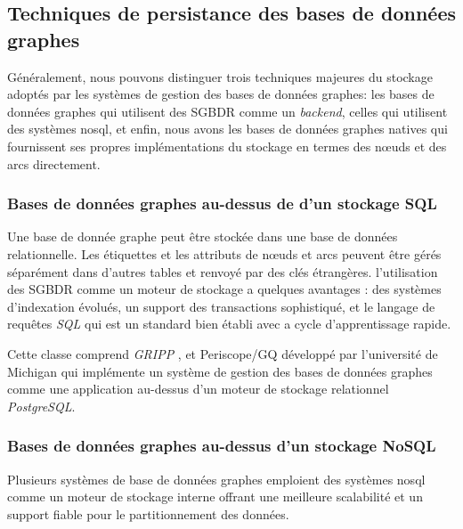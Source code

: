   \subsection{Techniques de persistance des bases de données graphes}
  \label{sec:persistence}
  Généralement, nous pouvons distinguer trois techniques majeures du
  stockage adoptés par les systèmes de gestion des bases de données
  graphes: les bases de données graphes qui utilisent des
  \acrshort{SGBDR} comme un \emph{backend}, celles qui utilisent des
  systèmes \acrshort{nosql}, et enfin, nous avons les bases de données
  graphes natives qui fournissent ses propres implémentations du
  stockage en termes des nœuds et des arcs directement.

    \subsubsection{Bases de données graphes au-dessus de d'un stockage  SQL}
    \label{sec:graphdb-over-sql}
    Une base de donnée graphe peut être stockée dans une base de
    données relationnelle. Les étiquettes et les attributs de nœuds et
    arcs peuvent être gérés séparément dans d'autres tables et renvoyé
    par des clés étrangères. l'utilisation des \acrshort{SGBDR} comme
    un moteur de stockage a quelques avantages : des systèmes
    d'indexation évolués, un support des transactions sophistiqué, et
    le langage de requêtes \emph{SQL} qui est un standard bien établi
    avec a cycle d'apprentissage rapide.\medskip

    Cette classe comprend \emph{GRIPP} \cite{trissl2007fast}, et
    Periscope/GQ \cite{tian2008periscope} développé par l'université
    de Michigan qui implémente un système de gestion des bases de
    données graphes comme une application au-dessus d'un moteur de
    stockage relationnel \emph{PostgreSQL}.
    \newpage

    \subsubsection{Bases de données graphes au-dessus d'un stockage NoSQL}
    \label{sec:graphdb-over-nosql}
    Plusieurs systèmes de base de données graphes emploient des
    systèmes \acrshort{nosql} comme un moteur de stockage interne
    offrant une meilleure scalabilité et un support fiable pour le
    partitionnement des données.\bigskip

